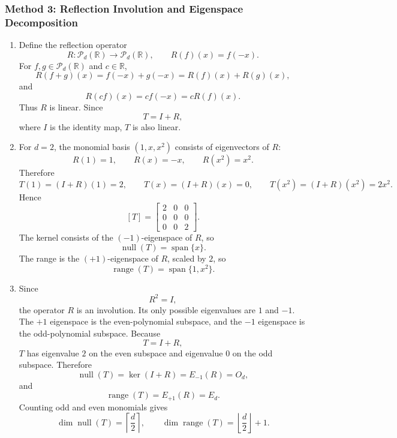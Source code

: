 \documentclass[12pt]{article}
\newcommand{\R}{\mathbb{R}}
\newcommand{\Ppoly}{\mathcal{P}}
\newcommand{\Null}{\operatorname{null}}
\newcommand{\Range}{\operatorname{range}}
\newcommand{\Span}{\operatorname{span}}
\begin{document}
\subsubsection{Method 3: Reflection Involution and Eigenspace Decomposition}
\begin{enumerate}[label=(\alph*)]
  \item Define the reflection operator
  \[
  R:\Ppoly_d(\R)\to\Ppoly_d(\R),
  \qquad
  R(f)(x)=f(-x).
  \]
  For $f,g\in\Ppoly_d(\R)$ and $c\in\R$,
  \[
  R(f+g)(x)=f(-x)+g(-x)=R(f)(x)+R(g)(x),
  \]
  and
  \[
  R(cf)(x)=cf(-x)=cR(f)(x).
  \]
  Thus $R$ is linear. Since
  \[
  T=I+R,
  \]
  where $I$ is the identity map, $T$ is also linear.

  \item For $d=2$, the monomial basis $(1,x,x^2)$ consists of eigenvectors of $R$:
  \[
  R(1)=1,
  \qquad
  R(x)=-x,
  \qquad
  R(x^2)=x^2.
  \]
  Therefore
  \[
  T(1)=(I+R)(1)=2,
  \qquad
  T(x)=(I+R)(x)=0,
  \qquad
  T(x^2)=(I+R)(x^2)=2x^2.
  \]
  Hence
  \[
  \boxed{[T]=\begin{bmatrix}
  2&0&0\\
  0&0&0\\
  0&0&2
  \end{bmatrix}.}
  \]
  The kernel consists of the $(-1)$-eigenspace of $R$, so
  \[
  \boxed{\Null(T)=\Span\{x\}.}
  \]
  The range is the $(+1)$-eigenspace of $R$, scaled by $2$, so
  \[
  \boxed{\Range(T)=\Span\{1,x^2\}.}
  \]

  \item Since
  \[
  R^2=I,
  \]
  the operator $R$ is an involution. Its only possible eigenvalues are $1$ and $-1$. The $+1$ eigenspace is the even-polynomial subspace, and the $-1$ eigenspace is the odd-polynomial subspace. Because
  \[
  T=I+R,
  \]
  $T$ has eigenvalue $2$ on the even subspace and eigenvalue $0$ on the odd subspace. Therefore
  \[
  \Null(T)=\ker(I+R)=E_{-1}(R)=O_d,
  \]
  and
  \[
  \Range(T)=E_{+1}(R)=E_d.
  \]
  Counting odd and even monomials gives
  \[
  \boxed{\dim\Null(T)=\left\lceil\frac d2\right\rceil,
  \qquad
  \dim\Range(T)=\left\lfloor\frac d2\right\rfloor+1.}
  \]
\end{enumerate}

\newpage
\end{document}
